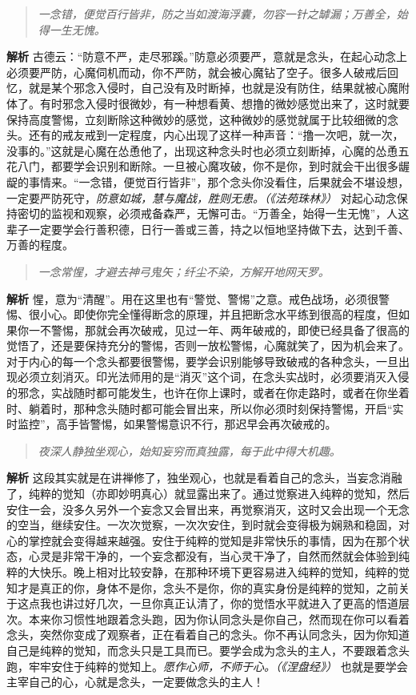 \begin{quote}\it
    一念错，便觉百行皆非，防之当如渡海浮囊，勿容一针之罅漏；万善全，始得一生无愧。
\end{quote}

\textbf{解析} 古德云：“防意不严，走尽邪蹊。”防意必须要严，意就是念头，在起心动念上必须要严防，心魔伺机而动，你不严防，就会被心魔钻了空子。很多人破戒后回忆，就是某个邪念入侵时，自己没有及时断掉，也就是没有防住，结果就被心魔附体了。有时邪念入侵时很微妙，有一种想看黄、想撸的微妙感觉出来了，这时就要保持高度警惕，立刻断除这种微妙的感觉，这种微妙的感觉就属于比较细微的念头。还有的戒友戒到一定程度，内心出现了这样一种声音：“撸一次吧，就一次，没事的。”这就是心魔在怂恿他了，出现这种念头时也必须立刻断掉，心魔的怂恿五花八门，都要学会识别和断除。一旦被心魔攻破，你不是你，到时就会干出很多龌龊的事情来。“一念错，便觉百行皆非”，那个念头你没看住，后果就会不堪设想，一定要严防死守，\textit{防意如城，慧与魔战，胜则无患。（《法苑珠林》）} 对起心动念保持密切的监视和观察，必须戒备森严，无懈可击。“万善全，始得一生无愧”，人这辈子一定要学会行善积德，日行一善或三善，持之以恒地坚持做下去，达到千善、万善的程度。

\begin{quote}\it
    一念常惺，才避去神弓鬼矢；纤尘不染，方解开地网天罗。
\end{quote}

\textbf{解析} 惺，意为“清醒”。用在这里也有“警觉、警惕”之意。戒色战场，必须很警惕、很小心。即使你完全懂得断念的原理，并且把断念水平练到很高的程度，但如果你一不警惕，那就会再次破戒，见过一年、两年破戒的，即使已经具备了很高的觉悟了，还是要保持充分的警惕，否则一放松警惕，心魔就笑了，因为机会来了。对于内心的每一个念头都要很警惕，要学会识别能够导致破戒的各种念头，一旦出现必须立刻消灭。印光法师用的是“消灭”这个词，在念头实战时，必须要消灭入侵的邪念，实战随时都可能发生，也许在你上课时，或者在你走路时，或者在你坐着时、躺着时，那种念头随时都可能会冒出来，所以你必须时刻保持警惕，开启“实时监控”，高手皆警惕，如果警惕意识不行，那迟早会再次破戒的。

\begin{quote}\it
    夜深人静独坐观心，始知妄穷而真独露，每于此中得大机趣。
\end{quote}

\textbf{解析} 这段其实就是在讲禅修了，独坐观心，也就是看着自己的念头，当妄念消融了，纯粹的觉知（亦即妙明真心）就显露出来了。通过觉察进入纯粹的觉知，然后安住一会，没多久另外一个妄念又会冒出来，再觉察消灭，这时又会出现一个无念的空当，继续安住。一次次觉察，一次次安住，到时就会变得极为娴熟和稳固，对心的掌控就会变得越来越强。安住于纯粹的觉知是非常快乐的事情，因为在那个状态，心灵是非常干净的，一个妄念都没有，当心灵干净了，自然而然就会体验到纯粹的大快乐。晚上相对比较安静，在那种环境下更容易进入纯粹的觉知，纯粹的觉知才是真正的你，身体不是你，念头不是你，你的真实身份是纯粹的觉知，之前关于这点我也讲过好几次，一旦你真正认清了，你的觉悟水平就进入了更高的悟道层次。本来你习惯性地跟着念头跑，因为你认同念头是你自己，然而现在你可以看着念头，突然你变成了观察者，正在看着自己的念头。你不再认同念头，因为你知道自己是纯粹的觉知，而念头只是工具而已。要学会成为念头的主人，不要跟着念头跑，牢牢安住于纯粹的觉知上。\textit{愿作心师，不师于心。（《涅盘经》）} 也就是要学会主宰自己的心，心就是念头，一定要做念头的主人！

